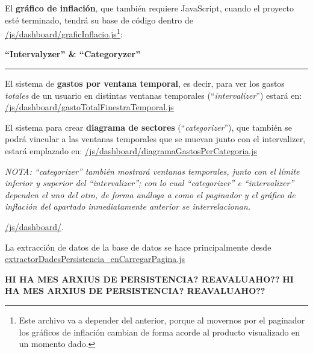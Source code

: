 \documentclass[a4paper,12pt]{report}
\begin{document}
	El \textbf{gráfico de inflación}, que también requiere JavaScript, cuando el proyecto esté terminado, tendrá su base de código dentro de \href{https://github.com/blackcub3s/mercApp/blob/main/APP%20WEB/__frontend__produccio__/app/js/dashboard/graficInflacio.js}{/js/dashboard/graficInflacio.js}\footnote{Este archivo va a depender del anterior, porque al movernos por el paginador los gráficos de inflación cambian de forma acorde al producto visualizado en un momento dado.}:
	
	\noindent \textbf{``Intervalyzer'' \& ``Categoryzer''}
	\hrule
	\vspace{.5em}
	
	El sistema de \textbf{gastos por ventana temporal}, es decir, para ver los gastos \textit{totales} de un usuario en distintas ventanas temporales (``\textit{intervalizer}'') estará en: \href{https://github.com/blackcub3s/mercApp/blob/main/APP%20WEB/__frontend__produccio__/app/js/dashboard/gastoTotalFinestraTemporal.js}{/js/dashboard/gastoTotalFinestraTemporal.js}
	
	
	El sistema para crear \textbf{diagrama de sectores} (``\textit{categorizer}''), que también se podrá vincular a las ventanas temporales que se muevan junto con el intervalizer, estará emplazado en:  \href{https://github.com/blackcub3s/mercApp/blob/main/APP%20WEB/__frontend__produccio__/app/js/dashboard/diagramaGastosPerCategoria.js}{/js/dashboard/diagramaGastosPerCategoria.js}
	

	
	
	\textit{NOTA:  ``categorizer'' también mostrará ventanas temporales, junto con el límite inferior y superior del ``intervalizer''; con lo cual ``categorizer'' e ``intervalizer'' dependen el uno del otro, de forma  análoga a como el paginador y el gráfico de inflación del apartado inmediatamente anterior se interrelacionan.}
	
	 
	 \href{https://github.com/blackcub3s/mercApp/blob/main/APP%20WEB/__frontend__produccio__/app/js/dashboard}{/js/dashboard/}.
	
	
	
	
	La extracción de datos de la base de datos se hace principalmente desde \href{	https://github.com/blackcub3s/mercApp/blob/main/APP%20WEB/__frontend__produccio__/app/js/dashboard/extractorDadesPersistencia_enCarregarPagina.js}{extractorDadesPersistencia\_enCarregarPagina.js}
	
	\textbf{HI HA MES ARXIUS DE PERSISTENCIA? REAVALUAHO??}
		\textbf{HI HA MES ARXIUS DE PERSISTENCIA? REAVALUAHO??}
	
\end{document}
